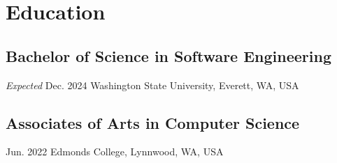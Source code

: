 \section{Education}
\subsection{Bachelor of Science in Software Engineering}{}{\textit{Expected} Dec. 2024}
Washington State University, Everett, WA, USA \hfill

\subsection{Associates of Arts in Computer Science}{}{Jun. 2022}
Edmonds College, Lynnwood, WA, USA \hfill
\vspace{0.2em}

